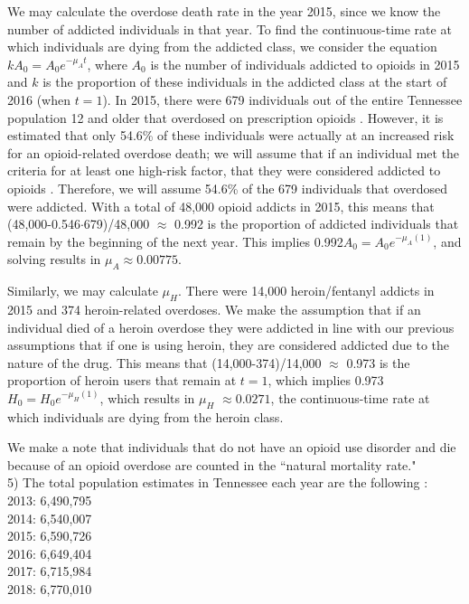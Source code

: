 \documentclass[12pt]{article}
\begin{document}
We may calculate the overdose death rate in the year 2015, since we know the number of addicted individuals in that year. To find the continuous-time rate at which individuals are dying from the addicted class, we consider the equation $k A_{0}=A_{0}e^{-\mu_{A}t}$, where $A_0$ is the number of individuals addicted to opioids in 2015 and $k$ is the proportion of these individuals in the addicted class at the start of 2016 (when $t=1$). In 2015, there were 679 individuals out of the entire Tennessee population 12 and older that overdosed on prescription opioids \cite{PDO}. However, it is estimated that only 54.6\% of these individuals were actually at an increased risk for an opioid-related overdose death; we will assume that if an individual met the criteria for at least one high-risk factor, that they were considered addicted to opioids \cite{Gwira}. Therefore, we will assume 54.6\% of the 679 individuals that overdosed were addicted. With a total of 48,000 opioid addicts in 2015, this means that (48,000-0.546$\cdot$679)/48,000 $\approx$ 0.992 is the proportion of addicted individuals that remain by the beginning of the next year. This implies 0.992$A_0=A_0 e^{-\mu_{A}(1)}$, and solving results in $\mu_{A} \approx 0.00775.$

Similarly, we may calculate $\mu_{H}$. There were 14,000 heroin/fentanyl addicts in 2015 and 374 heroin-related overdoses. We make the assumption that if an individual died of a heroin overdose they were addicted in line with our previous assumptions that if one is using heroin, they are considered addicted due to the nature of the drug. This means that (14,000-374)/14,000 $\approx$ 0.973 is the proportion of heroin users that remain at $t=1$, which implies 0.973$H_0=H_0 e^{-\mu_{H}(1)}$, which results in $\mu_{H}$ $\approx 0.0271$, the continuous-time rate at which individuals are dying from the heroin class.


We make a note that individuals that do not have an opioid use disorder and die because of an opioid overdose are counted in the ``natural mortality rate." \\

5) The total population estimates in Tennessee each year are the following \cite{USCensus}: \\
2013: 6,490,795 \\
2014: 6,540,007 \\
2015: 6,590,726 \\
2016: 6,649,404 \\
2017: 6,715,984 \\
2018: 6,770,010 
\end{document}

